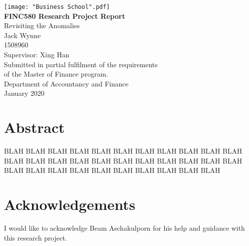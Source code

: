 \documentclass[12pt, a4paper, oneside]{article}
\begin{document}
\thispagestyle{empty}
\begin{center}

\vspace{-2em}\texttt{[image: "Business School".pdf]} \\
\vspace{0.9cm}
\Large \textbf{FINC580 Research Project Report} \\
\vspace{1.8cm}
\LARGE Revisiting the Anomalies
\\
\vspace{1.8cm}
\LARGE Jack Wynne \\
\Large 1508960 \\
\vspace{0.45cm}
\Large Supervisor: Xing Han \\
\vfill
\normalsize
Submitted in partial fulfilment of the requirements\\
of the Master of Finance program. \\
\vspace{0.45cm}
Department of Accountancy and Finance \\
\vspace{0.45cm}
January 2020
\vspace{2.7cm}
\end{center}

\raggedbottom
\pagebreak
\thispagestyle{plain}
\section*{\centering Abstract}
\vspace{0.45cm}
\doublespacing
BLAH BLAH BLAH BLAH BLAH BLAH BLAH BLAH BLAH BLAH BLAH BLAH BLAH BLAH BLAH BLAH BLAH BLAH BLAH BLAH BLAH BLAH BLAH BLAH BLAH BLAH BLAH BLAH BLAH BLAH BLAH BLAH 
\raggedbottom
\pagebreak

\thispagestyle{plain}
\section*{\centering Acknowledgements}
I would like to acknowledge Beam Aschakulporn for his help and guidance with this research project.

\raggedbottom
\pagebreak

\onehalfspacing
\thispagestyle{plain}
\renewcommand{\contentsname}{Table of Contents}
\tableofcontents
\raggedbottom
\pagebreak
\thispagestyle{plain}
\listoftables
\raggedbottom
\pagebreak
{}
\pagestyle{fancy}
\doublespacing
\end{document}
